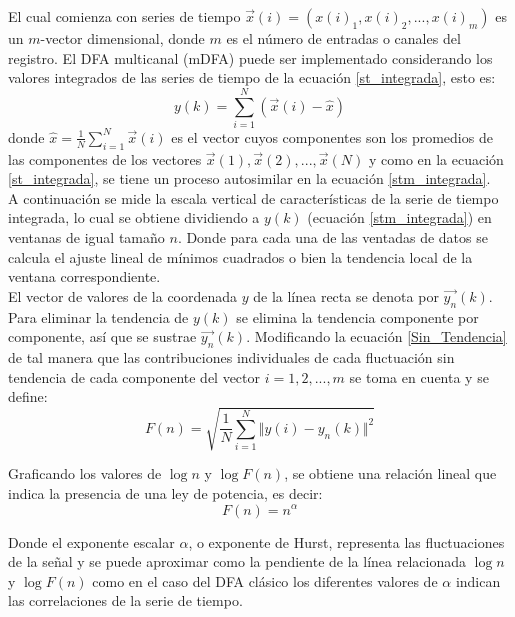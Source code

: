 \documentclass[letterpaper,titlepage,12pt,draft]{report}
\begin{document}
El cual comienza con series de tiempo $\overrightarrow{x}(i)=(x(i)_1,x(i)_2,...,x(i)_m)$ es un $m$-vector dimensional, donde $m$ es el n\'umero de entradas o canales del registro. El DFA multicanal (mDFA)\cite{mDFA} puede ser implementado considerando los valores integrados de las series de tiempo de la ecuaci\'on \eqref{st_integrada}, esto es:
\begin{equation}
y(k)=\sum_{i=1}^{N}(\overrightarrow{x}(i)-\widehat{x})\label{stm_integrada}
\end{equation}
donde $\widehat{x}=\frac{1}{N}\sum_{i=1}^{N}\overrightarrow{x}(i)$ es el vector cuyos componentes son los promedios de las componentes de los vectores $\overrightarrow{x}(1),\overrightarrow{x}(2),...,\overrightarrow{x}(N)$ y como en la ecuaci\'on \eqref{st_integrada}, se tiene un proceso autosimilar en la ecuaci\'on \eqref{stm_integrada}.\\

A continuaci\'on se mide la escala vertical de caracter\'isticas de la serie de tiempo integrada, lo cual se obtiene dividiendo a $y(k)$ (ecuaci\'on \eqref{stm_integrada}) en ventanas de igual tama\~no $n$. Donde para cada una de las ventadas de datos se calcula el ajuste lineal de m\'inimos cuadrados o bien la tendencia local de la ventana correspondiente.\\

El vector de valores de la coordenada $y$ de la l\'inea recta se denota por $\overrightarrow{y_n}(k)$. Para eliminar la tendencia de $y(k)$ se elimina la tendencia componente por componente, as\'i  que se sustrae $\overrightarrow{y_n}(k)$. Modificando la ecuaci\'on \eqref{Sin_Tendencia} de tal manera que las contribuciones individuales de cada fluctuaci\'on sin tendencia de cada componente del vector $i=1,2,...,m$ se toma en cuenta y se define:
\begin{equation}
F(n)=\sqrt{\frac{1}{N}\sum_{i=1}^{N}\Vert y(i)-y_n(k)\Vert ^2}\label{mSin_Tendencia}
\end{equation}

Graficando los valores de $\log n$ y $\log F(n)$, se obtiene una relaci\'on lineal que indica la presencia de una ley de potencia, es decir:
\begin{equation}
F(n)=n^\alpha
\end{equation}

Donde el exponente escalar $\alpha$, o exponente de Hurst, representa las fluctuaciones de la se\~nal y se puede aproximar como la pendiente de la l\'inea relacionada $\log n$ y $\log F(n)$ como en el caso del DFA cl\'asico los diferentes valores de $\alpha$ indican las correlaciones de la serie de tiempo.\\
\end{document}
